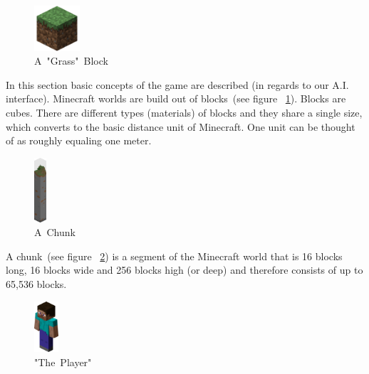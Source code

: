 \begin{figure}
  \begin{center}
    \includegraphics[width=0.15\textwidth]{graphics/block}
  \end{center}
  \caption{A~"Grass"~Block~\cite{image_mob}}
  \label{mc_block}
\end{figure}

In this section basic concepts of the game are described (in regards to our A.I. interface). Minecraft worlds are build out of blocks~(see figure ~\ref{mc_block}). Blocks are cubes. There are different types (materials) of blocks and they share a single size, which converts to the basic distance unit of Minecraft. One unit can be thought of as roughly equaling one meter.

\begin{figure}
  \begin{center}
    \includegraphics[width=0.04\textwidth]{graphics/chunk}
  \end{center}
  \caption{A~Chunk~\cite{image_mob}}
  \label{mc_chunk}
\end{figure}  

A chunk~(see figure ~\ref{mc_chunk}) is a segment of the Minecraft world that is 16 blocks long, 16 blocks wide and 256 blocks high (or deep) and therefore consists of up to 65,536 blocks.~\cite{mcwiki_chunks}

\begin{figure}
  \begin{center}
    \includegraphics[width=0.08\textwidth]{graphics/player}
  \end{center}
  \caption{"The~Player"~\cite{image_mob}}
  \label{mc_player}
\end{figure} 

